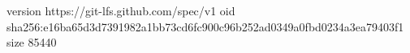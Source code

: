 version https://git-lfs.github.com/spec/v1
oid sha256:e16ba65d3d7391982a1bb73cd6fc900c96b252ad0349a0fbd0234a3ea79403f1
size 85440
